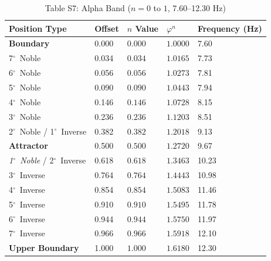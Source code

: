 \documentclass[11pt,a4paper]{article}
\newcommand{\degree}{$^\circ$}  %
\begin{document}
\begin{table}[H]
\centering
\caption*{Table S7: Alpha Band ($n = 0$ to $1$, 7.60--12.30 Hz)}
\begin{tabular}{@{}lllll@{}}
\toprule
Position Type & Offset & $n$ Value & $\varphi^n$ & Frequency (Hz) \\
\midrule
\textbf{Boundary} & 0.000 & $0.000$ & $1.0000$ & 7.60 \\
7\degree\ Noble & 0.034 & $0.034$ & $1.0165$ & 7.73 \\
6\degree\ Noble & 0.056 & $0.056$ & $1.0273$ & 7.81 \\
5\degree\ Noble & 0.090 & $0.090$ & $1.0443$ & 7.94 \\
4\degree\ Noble & 0.146 & $0.146$ & $1.0728$ & 8.15 \\
3\degree\ Noble & 0.236 & $0.236$ & $1.1203$ & 8.51 \\
2\degree\ Noble / 1\degree\ Inverse & 0.382 & $0.382$ & $1.2018$ & 9.13 \\
\textbf{Attractor} & 0.500 & $0.500$ & $1.2720$ & 9.67 \\
\textit{1\degree\ Noble} / 2\degree\ Inverse & 0.618 & $0.618$ & $1.3463$ & 10.23 \\
3\degree\ Inverse & 0.764 & $0.764$ & $1.4443$ & 10.98 \\
4\degree\ Inverse & 0.854 & $0.854$ & $1.5083$ & 11.46 \\
5\degree\ Inverse & 0.910 & $0.910$ & $1.5495$ & 11.78 \\
6\degree\ Inverse & 0.944 & $0.944$ & $1.5750$ & 11.97 \\
7\degree\ Inverse & 0.966 & $0.966$ & $1.5918$ & 12.10 \\
\textbf{Upper Boundary} & 1.000 & $1.000$ & $1.6180$ & 12.30 \\
\bottomrule
\end{tabular}
\end{table}
\end{document}
